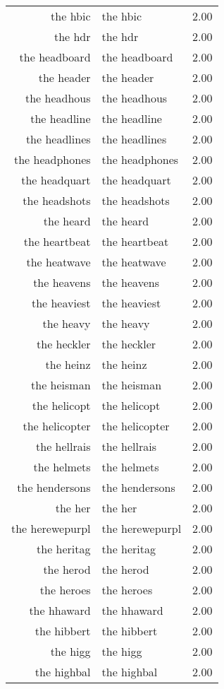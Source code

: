 \begin{table}[ht]
\begin{tabular}{rlr}
  the hbic & the hbic & 2.00 \\ 
  the hdr & the hdr & 2.00 \\ 
  the headboard & the headboard & 2.00 \\ 
  the header & the header & 2.00 \\ 
  the headhous & the headhous & 2.00 \\ 
  the headline & the headline & 2.00 \\ 
  the headlines & the headlines & 2.00 \\ 
  the headphones & the headphones & 2.00 \\ 
  the headquart & the headquart & 2.00 \\ 
  the headshots & the headshots & 2.00 \\ 
  the heard & the heard & 2.00 \\ 
  the heartbeat & the heartbeat & 2.00 \\ 
  the heatwave & the heatwave & 2.00 \\ 
  the heavens & the heavens & 2.00 \\ 
  the heaviest & the heaviest & 2.00 \\ 
  the heavy & the heavy & 2.00 \\ 
  the heckler & the heckler & 2.00 \\ 
  the heinz & the heinz & 2.00 \\ 
  the heisman & the heisman & 2.00 \\ 
  the helicopt & the helicopt & 2.00 \\ 
  the helicopter & the helicopter & 2.00 \\ 
  the hellrais & the hellrais & 2.00 \\ 
  the helmets & the helmets & 2.00 \\ 
  the hendersons & the hendersons & 2.00 \\ 
  the her & the her & 2.00 \\ 
  the herewepurpl & the herewepurpl & 2.00 \\ 
  the heritag & the heritag & 2.00 \\ 
  the herod & the herod & 2.00 \\ 
  the heroes & the heroes & 2.00 \\ 
  the hhaward & the hhaward & 2.00 \\ 
  the hibbert & the hibbert & 2.00 \\ 
  the higg & the higg & 2.00 \\ 
  the highbal & the highbal & 2.00 \\ 

\end{tabular}
\end{table}

